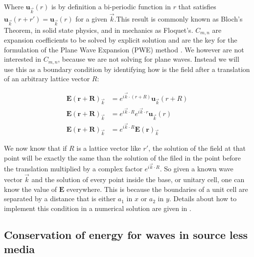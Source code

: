 Where $\mathbf{u}_{\vec{k}}(r)$ is by definition a bi-periodic function in $r$ that satisfies  $\mathbf{u}_{\vec{k}}(r+r') = \mathbf{u}_{\vec{k}}(r)$ for a given $\vec{k}$.This result is commonly known as Bloch's Theorem, in solid state physics, and in mechanics as Floquet's. $C_{m,n}$ are expansion coefficients to be solved by explicit solution and are the key for the formulation of the Plane Wave Expansion (PWE) method \cite{Loaiza2011, Joannopoulos2008, StevenG, Johnson2001}. We however are not interested in $C_{m,n}$, because we are not solving for plane waves. Instead we will use this as a boundary condition by identifying how is the field after a translation of an arbitrary lattice vector $R$:

\begin{align}
\mathbf{E(r+R)}_{\vec{k}} &= e^{i\vec{k}\cdot (r+R)} \mathbf{u}_{\vec{k}}(r+R)\\
\mathbf{E(r+R)}_{\vec{k}} &= e^{i\vec{k}\cdot R}e^{i\vec{k}\cdot r} \mathbf{u}_{\vec{k}}(r)\\
\mathbf{E(r+R)}_{\vec{k}} &= e^{i\vec{k}\cdot R}\mathbf{E(r)}_{\vec{k}}
\end{align}

We now know that if $R$ is a lattice vector like $r'$, the solution of the field at that point will be exactly the same than the solution of the filed in the point before the translation multiplied by a complex factor $e^{i\vec{k}\cdot R}$. So given a known wave vector $\vec{k}$ and the solution of every point inside the base, or unitary cell, one can know the value of $\mathbf{E}$ everywhere. This is because the boundaries of a unit cell are separated by a distance that is either $a_1$ in $x$ or $a_2$ in $y$. Details about how to implement this condition in a numerical solution are given in \cite{Guarin2012}.

\subsection{Conservation of energy for waves in source less media}

